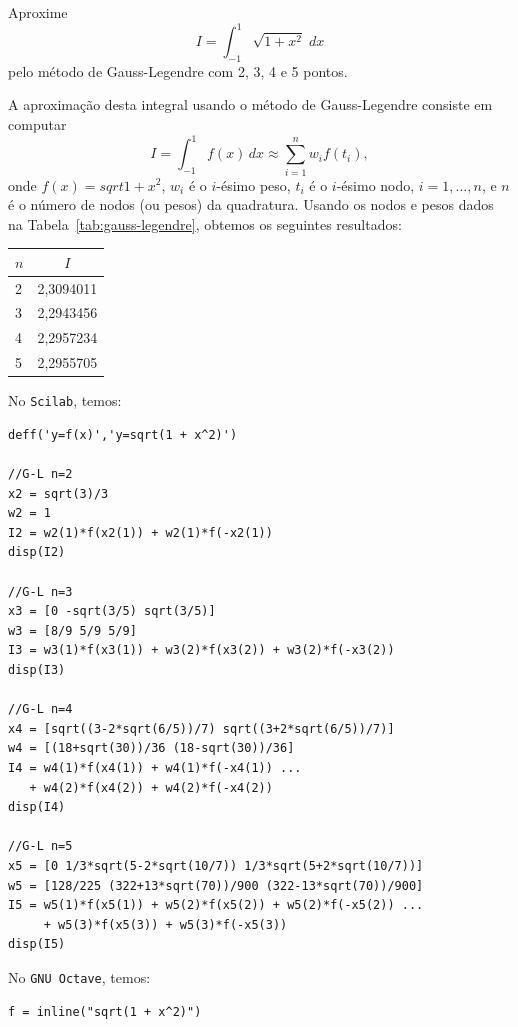 \begin{ex} Aproxime
  \begin{equation*}
    I = \int_{-1}^1\sqrt{1+x^2}\;dx  
  \end{equation*}
pelo método de Gauss-Legendre com 2, 3, 4 e 5 pontos.
\end{ex}
\begin{sol}
  A aproximação desta integral usando o método de Gauss-Legendre consiste em computar
  \begin{equation*}
    I = \int_{-1}^1 f(x)\,dx \approx \sum_{i=1}^n w_if(t_i),
  \end{equation*}
onde $f(x) = sqrt{1 + x^2}$, $w_i$ é o $i$-ésimo peso, $t_i$ é o $i$-ésimo nodo, $i=1, \dotsc, n$, e $n$ é o número de nodos (ou pesos) da quadratura. Usando os nodos e pesos dados na Tabela~\ref{tab:gauss-legendre}, obtemos os seguintes resultados:
\begin{center}
  \begin{tabular}{l|c}
    $n$ & $I$ \\\hline
    2 & 2,3094011\\
    3 & 2,2943456\\
    4 & 2,2957234\\
    5 & 2,2955705\\\hline
  \end{tabular}
\end{center}

\ifisscilab
No \verb+Scilab+, temos:
\begin{verbatim}
deff('y=f(x)','y=sqrt(1 + x^2)')

//G-L n=2
x2 = sqrt(3)/3
w2 = 1
I2 = w2(1)*f(x2(1)) + w2(1)*f(-x2(1))
disp(I2)

//G-L n=3
x3 = [0 -sqrt(3/5) sqrt(3/5)]
w3 = [8/9 5/9 5/9]
I3 = w3(1)*f(x3(1)) + w3(2)*f(x3(2)) + w3(2)*f(-x3(2))
disp(I3)

//G-L n=4
x4 = [sqrt((3-2*sqrt(6/5))/7) sqrt((3+2*sqrt(6/5))/7)]
w4 = [(18+sqrt(30))/36 (18-sqrt(30))/36]
I4 = w4(1)*f(x4(1)) + w4(1)*f(-x4(1)) ...
   + w4(2)*f(x4(2)) + w4(2)*f(-x4(2))
disp(I4)

//G-L n=5
x5 = [0 1/3*sqrt(5-2*sqrt(10/7)) 1/3*sqrt(5+2*sqrt(10/7))]
w5 = [128/225 (322+13*sqrt(70))/900 (322-13*sqrt(70))/900]
I5 = w5(1)*f(x5(1)) + w5(2)*f(x5(2)) + w5(2)*f(-x5(2)) ...
     + w5(3)*f(x5(3)) + w5(3)*f(-x5(3))
disp(I5)
\end{verbatim}
\fi 
\ifisoctave
No \verb+GNU Octave+, temos:
\begin{verbatim}
f = inline("sqrt(1 + x^2)")


\end{verbatim}
\end{sol}
